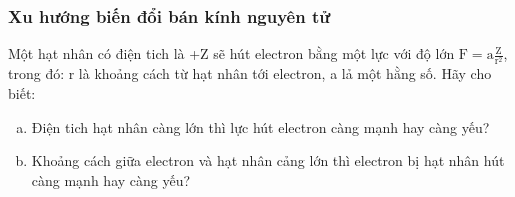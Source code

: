 \subsubsection{Xu hướng biến đổi bán kính nguyên tử}
\vspace{0.25cm}
\begin{hoivadap}
	\begin{cauhoi}
		Một hạt nhân có điện tich là +Z sẽ hút electron bằng một lực với độ lớn $\mathrm{F}=\mathrm{a} \tfrac{\mathrm{Z}}{\mathrm{r}^2}$, trong đó: r là khoảng cách từ hạt nhân tới electron, a lả một hằng số. Hãy cho biết:
		\begin{enumerate}[a)]
			\item  Điện tich hạt nhân càng lớn thì lực hút electron càng mạnh hay càng yếu?
			\item  Khoảng cách giữa electron và hạt nhân cảng lớn thì electron bị hạt nhân hút càng mạnh hay càng yếu?
		\end{enumerate}
	\end{cauhoi}
\end{hoivadap}
\vspace{0.25cm}
